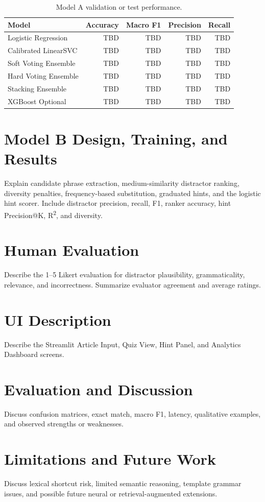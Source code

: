 \documentclass[11pt]{article}
\begin{document}
\begin{table}[h]
\centering
\begin{tabular}{lrrrr}
\toprule
Model & Accuracy & Macro F1 & Precision & Recall \\
\midrule
Logistic Regression & TBD & TBD & TBD & TBD \\
Calibrated LinearSVC & TBD & TBD & TBD & TBD \\
Soft Voting Ensemble & TBD & TBD & TBD & TBD \\
Hard Voting Ensemble & TBD & TBD & TBD & TBD \\
Stacking Ensemble & TBD & TBD & TBD & TBD \\
XGBoost Optional & TBD & TBD & TBD & TBD \\
\bottomrule
\end{tabular}
\caption{Model A validation or test performance.}
\end{table}

\section{Model B Design, Training, and Results}
Explain candidate phrase extraction, medium-similarity distractor ranking, diversity penalties, frequency-based substitution, graduated hints, and the logistic hint scorer. Include distractor precision, recall, F1, ranker accuracy, hint Precision@K, R\textsuperscript{2}, and diversity.

\section{Human Evaluation}
Describe the 1--5 Likert evaluation for distractor plausibility, grammaticality, relevance, and incorrectness. Summarize evaluator agreement and average ratings.

\section{UI Description}
Describe the Streamlit Article Input, Quiz View, Hint Panel, and Analytics Dashboard screens.

\section{Evaluation and Discussion}
Discuss confusion matrices, exact match, macro F1, latency, qualitative examples, and observed strengths or weaknesses.

\section{Limitations and Future Work}
Discuss lexical shortcut risk, limited semantic reasoning, template grammar issues, and possible future neural or retrieval-augmented extensions.
\end{document}
